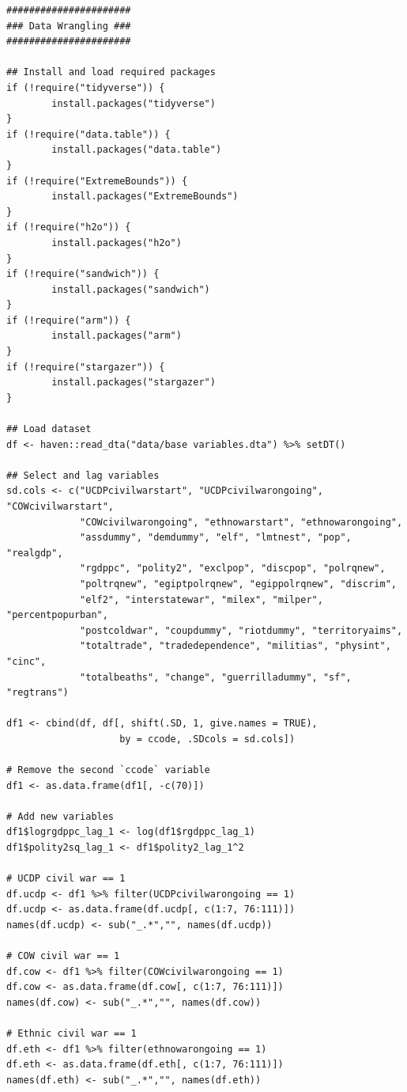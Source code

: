 \singlespacing
\small
\begin{verbatim}
######################
### Data Wrangling ###
######################

## Install and load required packages 
if (!require("tidyverse")) {
        install.packages("tidyverse")
}
if (!require("data.table")) {
        install.packages("data.table")
}
if (!require("ExtremeBounds")) {
        install.packages("ExtremeBounds")
}
if (!require("h2o")) {
        install.packages("h2o")
}
if (!require("sandwich")) {
        install.packages("sandwich")
}
if (!require("arm")) {
        install.packages("arm")
}
if (!require("stargazer")) {
        install.packages("stargazer")
}

## Load dataset
df <- haven::read_dta("data/base variables.dta") %>% setDT()

## Select and lag variables
sd.cols <- c("UCDPcivilwarstart", "UCDPcivilwarongoing", "COWcivilwarstart",
             "COWcivilwarongoing", "ethnowarstart", "ethnowarongoing",
             "assdummy", "demdummy", "elf", "lmtnest", "pop", "realgdp",
             "rgdppc", "polity2", "exclpop", "discpop", "polrqnew",
             "poltrqnew", "egiptpolrqnew", "egippolrqnew", "discrim",
             "elf2", "interstatewar", "milex", "milper", "percentpopurban",
             "postcoldwar", "coupdummy", "riotdummy", "territoryaims",
             "totaltrade", "tradedependence", "militias", "physint", "cinc",
             "totalbeaths", "change", "guerrilladummy", "sf", "regtrans")

df1 <- cbind(df, df[, shift(.SD, 1, give.names = TRUE),
                    by = ccode, .SDcols = sd.cols]) 

# Remove the second `ccode` variable
df1 <- as.data.frame(df1[, -c(70)])

# Add new variables
df1$logrgdppc_lag_1 <- log(df1$rgdppc_lag_1)
df1$polity2sq_lag_1 <- df1$polity2_lag_1^2

# UCDP civil war == 1
df.ucdp <- df1 %>% filter(UCDPcivilwarongoing == 1)
df.ucdp <- as.data.frame(df.ucdp[, c(1:7, 76:111)])
names(df.ucdp) <- sub("_.*","", names(df.ucdp)) 

# COW civil war == 1
df.cow <- df1 %>% filter(COWcivilwarongoing == 1)
df.cow <- as.data.frame(df.cow[, c(1:7, 76:111)])
names(df.cow) <- sub("_.*","", names(df.cow)) 

# Ethnic civil war == 1
df.eth <- df1 %>% filter(ethnowarongoing == 1)
df.eth <- as.data.frame(df.eth[, c(1:7, 76:111)])
names(df.eth) <- sub("_.*","", names(df.eth)) 


\end{verbatim}
